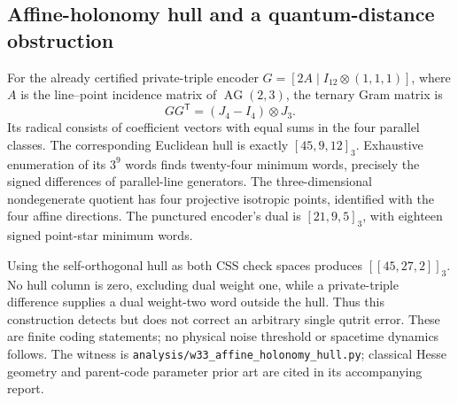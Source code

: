 \subsection{Affine-holonomy hull and a quantum-distance obstruction}
For the already certified private-triple encoder
$G=[2A\mid I_{12}\otimes(1,1,1)]$, where $A$ is the line--point incidence
matrix of $\operatorname{AG}(2,3)$, the ternary Gram matrix is
\[
GG^{\mathsf T}=(J_4-I_4)\otimes J_3.
\]
Its radical consists of coefficient vectors with equal sums in the four
parallel classes. The corresponding Euclidean hull is exactly
$[45,9,12]_3$. Exhaustive enumeration of its $3^9$ words finds twenty-four
minimum words, precisely the signed differences of parallel-line generators.
The three-dimensional nondegenerate quotient has four projective isotropic
points, identified with the four affine directions. The punctured encoder's
dual is $[21,9,5]_3$, with eighteen signed point-star minimum words.

Using the self-orthogonal hull as both CSS check spaces produces
$[[45,27,2]]_3$. No hull column is zero, excluding dual weight one, while a
private-triple difference supplies a dual weight-two word outside the hull.
Thus this construction detects but does not correct an arbitrary single
qutrit error. These are finite coding statements; no physical noise threshold
or spacetime dynamics follows. The witness is
\texttt{analysis/w33\_affine\_holonomy\_hull.py}; classical Hesse geometry and
parent-code parameter prior art are cited in its accompanying report.
